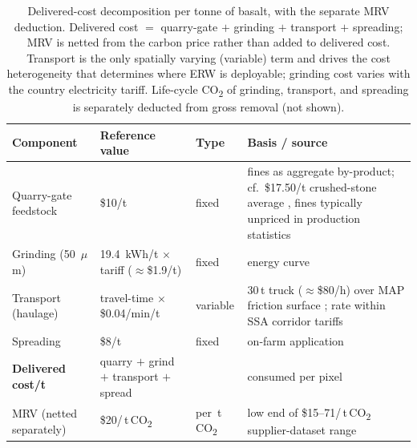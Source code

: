 \documentclass[12pt]{article}
\newcommand{\tco}{\,t\,CO\textsubscript{2}}
\newcommand{\co}{CO\textsubscript{2}}
\begin{document}
\begin{table}[t]
\centering
\caption{Delivered-cost decomposition per tonne of basalt, with the separate MRV
deduction. Delivered cost $=$ quarry-gate $+$ grinding $+$ transport $+$
spreading; MRV is netted from the carbon price rather than added to delivered
cost. Transport is the only spatially varying (variable) term and drives the
cost heterogeneity that determines where ERW is deployable; grinding cost varies
with the country electricity tariff. Life-cycle \co{} of grinding, transport, and
spreading is separately deducted from gross removal (not shown).}
\label{tab:costs}
\footnotesize
\setlength{\tabcolsep}{4pt}
\begin{tabular}{@{}p{2.9cm}p{4.3cm}p{1.15cm}p{4.7cm}@{}}
\toprule
Component & Reference value & Type & Basis / source \\
\midrule
Quarry-gate feedstock & \$10/t & fixed & fines as aggregate by-product; cf.\ \$17.50/t crushed-stone average \citep{usgs2024mcs}, fines typically unpriced in production statistics \citep{madankan2023} \\
Grinding (50~$\mu$m) & 19.4~kWh/t $\times$ tariff ($\approx$\$1.9/t) & fixed & \citet{strefler2018} energy curve \\
Transport (haulage) & travel-time $\times$ \$0.04/min/t & variable & 30\,t truck (\(\approx\)\$80/h) over MAP friction surface \citep{weiss2020}; rate within SSA corridor tariffs \citep{teravaninthorn2009} \\
Spreading & \$8/t & fixed & on-farm application \\
\midrule
\textbf{Delivered cost/t} & quarry $+$ grind $+$ transport $+$ spread & & consumed per pixel \\
MRV (netted separately) & \$20/\tco{} & per \tco{} & low end of \$15--71/\tco{} supplier-dataset range \citep{mercer2024} \\
\bottomrule
\end{tabular}
\end{table}
\end{document}
